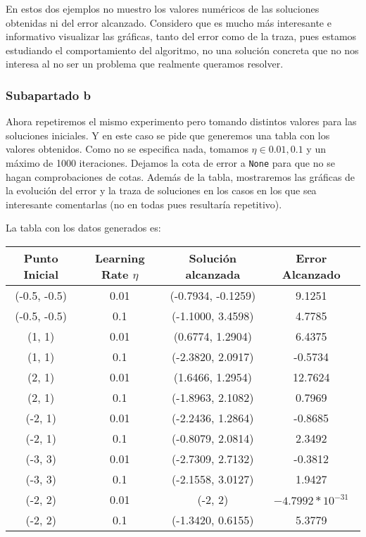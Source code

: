 \documentclass[11pt]{article}
\begin{document}
En estos dos ejemplos no muestro los valores numéricos de las soluciones obtenidas ni del error alcanzado. Considero que es mucho más interesante e informativo visualizar las gráficas, tanto del error como de la traza, pues estamos estudiando el comportamiento del algoritmo, no una solución concreta que no nos interesa al no ser un problema que realmente queramos resolver.

\subsubsection{Subapartado b}

Ahora repetiremos el mismo experimento pero tomando distintos valores para las soluciones iniciales. Y en este caso se pide que generemos una tabla con los valores obtenidos. Como no se especifica nada, tomamos $\eta \in {0.01, 0.1}$ y un máximo de 1000 iteraciones. Dejamos la cota de error a \lstinline{None} para que no se hagan comprobaciones de cotas. Además de la tabla, mostraremos las gráficas de la evolución del error y la traza de soluciones en los casos en los que sea interesante comentarlas (no en todas pues resultaría repetitivo).

La tabla con los datos generados es:

\begin{center}
    \begin{tabular}{| c | c | c | c |}
        Punto Inicial & Learning Rate $\eta$ & Solución alcanzada & Error Alcanzado \\
        \hline
        (-0.5, -0.5) & 0.01 & (-0.7934, -0.1259) & 9.1251\\
        (-0.5, -0.5) & 0.1 & (-1.1000, 3.4598) & 4.7785 \\
        (1, 1) & 0.01 & (0.6774, 1.2904) & 6.4375 \\
        (1, 1) & 0.1 & (-2.3820, 2.0917) & -0.5734 \\
        (2, 1) & 0.01 & (1.6466, 1.2954) & 12.7624 \\
        (2, 1) & 0.1 & (-1.8963,  2.1082) & 0.7969 \\
        (-2,  1) & 0.01 & (-2.2436,  1.2864) & -0.8685 \\
        (-2,  1) & 0.1 & (-0.8079, 2.0814) & 2.3492 \\
        (-3,  3) & 0.01 & (-2.7309,  2.7132) & -0.3812 \\
        (-3,  3) & 0.1 & (-2.1558,  3.0127) & 1.9427 \\
        (-2,  2) & 0.01 & (-2,  2) & $-4.7992 * 10^{-31}$ \\
        (-2,  2) & 0.1 & (-1.3420, 0.6155) & 5.3779 \\
        \hline
    \end{tabular}

\end{center}
\end{document}
